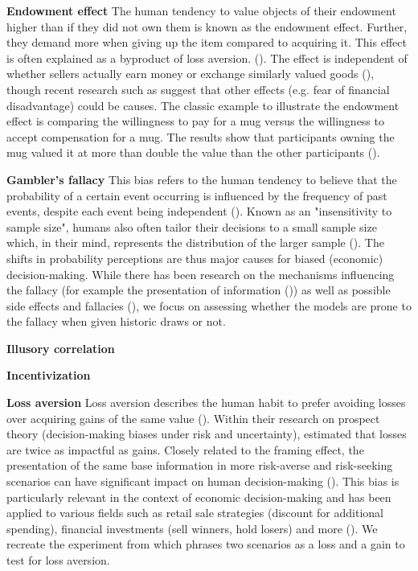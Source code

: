 \par \textbf{Endowment effect} The human tendency to value objects of their endowment higher than if they did not own them is known as the endowment effect. Further, they demand more when giving up the item compared to acquiring it. This effect is often explained as a byproduct of loss aversion. (\cite{kahneman1990experimental}). The effect is independent of whether sellers actually earn money or exchange similarly valued goods (\cite{knetsch1989endowment}), though recent research such as \cite{weaver2012reference} suggest that other effects (e.g. fear of financial disadvantage) could be causes. The classic example to illustrate the endowment effect is comparing the willingness to pay for a mug versus the willingness to accept compensation for a mug. The results show that participants owning the mug valued it at more than double the value than the other participants (\cite{kahneman1990experimental}).

\par \textbf{Gambler's fallacy} This bias refers to the human tendency to believe that the probability of a certain event occurring is influenced by the frequency of past events, despite each event being independent (\cite{bar1991perception,kovic2019gambler}). Known as an "insensitivity to sample size", humans also often tailor their decisions to a small sample size which, in their mind, represents the distribution of the larger sample (\cite{tversky1974judgment}). The shifts in probability perceptions are thus major causes for biased (economic) decision-making. While there has been research on the mechanisms influencing the fallacy (for example the presentation of information (\cite{barron2010role})) as well as possible side effects and fallacies (\cite{kovic2019gambler}), we focus on assessing whether the models are prone to the fallacy when given historic draws or not.

\par \textbf{Illusory correlation} 

\par \textbf{Incentivization} 

\par \textbf{Loss aversion} Loss aversion describes the human habit to prefer avoiding losses over acquiring gains of the same value  (\cite{liu2023review}). Within their research on prospect theory (decision-making biases under risk and uncertainty), \cite{tversky1992advances} estimated that losses are twice as impactful as gains. Closely related to the framing effect, the presentation of the same base information in more risk-averse and risk-seeking scenarios can have significant impact on human decision-making (\cite{druckman2001evaluating}). This bias is particularly relevant in the context of economic decision-making and has been applied to various fields such as retail sale strategies (discount for additional spending), financial investments (sell winners, hold losers) and more (\cite{liu2023review}). We recreate the experiment from \cite{thaler2015misbehaving} which phrases two scenarios as a loss and a gain to test for loss aversion.

